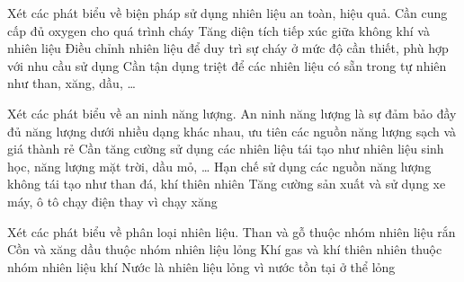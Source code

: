 \documentclass[Main.tex]{subfiles}
\begin{document}
\begin{ex}%
	Xét các phát biểu về biện pháp sử dụng nhiên liệu an toàn, hiệu quả.
	\choiceTF
	{\True Cần cung cấp đủ oxygen cho quá trình cháy}
	{\True Tăng diện tích tiếp xúc giữa không khí và nhiên liệu}
	{\True Điều chỉnh nhiên liệu để duy trì sự cháy ở mức độ cần thiết, phù hợp với nhu cầu sử dụng}
	{Cần tận dụng triệt để các nhiên liệu có sẵn trong tự nhiên như than, xăng, dầu, …}
\end{ex}

\begin{ex}%
	Xét các phát biểu về an ninh năng lượng.
	\choiceTF
	{\True An ninh năng lượng là sự đảm bảo đầy đủ năng lượng dưới nhiều dạng khác nhau, ưu tiên các nguồn năng lượng sạch và giá thành rẻ}
	{Cần tăng cường sử dụng các nhiên liệu tái tạo như nhiên liệu sinh học, năng lượng mặt trời, dầu mỏ, …}
	{\True Hạn chế sử dụng các nguồn năng lượng không tái tạo như than đá, khí thiên nhiên}
	{\True Tăng cường sản xuất và sử dụng xe máy, ô tô chạy điện thay vì chạy xăng}
\end{ex}

\begin{ex}%
	Xét các phát biểu về phân loại nhiên liệu.
	\choiceTF
	{\True Than và gỗ thuộc nhóm nhiên liệu rắn}
	{\True Cồn và xăng dầu thuộc nhóm nhiên liệu lỏng}
	{\True Khí gas và khí thiên nhiên thuộc nhóm nhiên liệu khí}
	{Nước là nhiên liệu lỏng vì nước tồn tại ở thể lỏng}
\end{ex}
\end{document}
